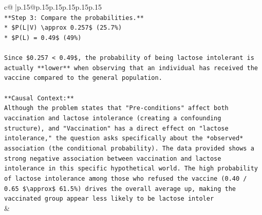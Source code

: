 \documentclass{article}
\begin{document}
{\begin{supertabular}{c@{$\;$}|p{.15\linewidth}@{}p{.15\linewidth}p{.15\linewidth}p{.15\linewidth}p{.15\linewidth}p{.15\linewidth}}
{{{\\ 
\texttt{**Step 3: Compare the probabilities.**} \\
\texttt{*   \$P(L|V) \textbackslash{}approx 0.257\$ (25.7\%)} \\
\texttt{*   \$P(L) = 0.49\$ (49\%)} \\
\\ 
\texttt{Since \$0.257 < 0.49\$, the probability of being lactose intolerant is actually **lower** when observing that an individual has received the vaccine compared to the general population.} \\
\\ 
\texttt{**Causal Context:**} \\
\texttt{Although the problem states that "Pre{-}conditions" affect both vaccination and lactose intolerance (creating a confounding structure), and "Vaccination" has a direct effect on "lactose intolerance," the question asks specifically about the *observed* association (the conditional probability). The data provided shows a strong negative association between vaccination and lactose intolerance in this specific hypothetical world. The high probability of lactose intolerance among those who refused the vaccine (0.40 / 0.65 \$\textbackslash{}approx\$ 61.5\%) drives the overall average up, making the vaccinated group appear less likely to be lactose intoler} \\
            }
        }
    }
    & \\ \\


\end{supertabular}}
\end{document}
